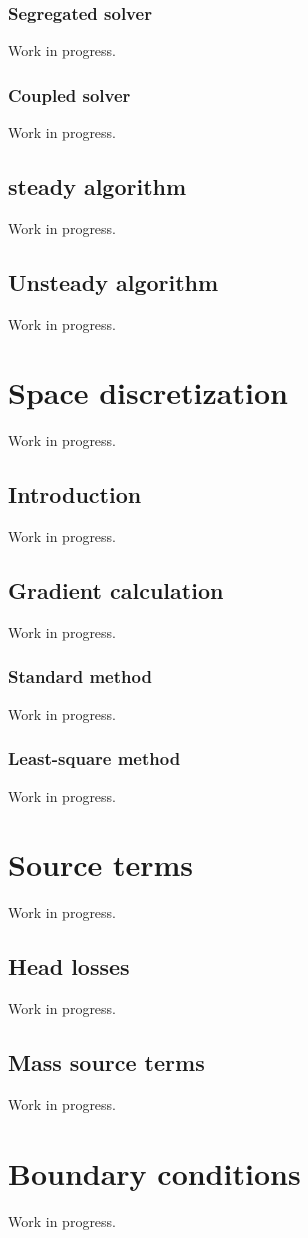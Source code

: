 \documentclass[a4paper,10pt,twoside]{csdoc}
\newcounter{prog}[part]
\begin{document}
\subsection{Segregated solver}
Work in progress.
\subsection{Coupled solver}
Work in progress.
\section{steady algorithm}
Work in progress.
\section{Unsteady algorithm}
Work in progress.

\chapter{Space discretization}
Work in progress.
\section{Introduction}
Work in progress.
\section{Gradient calculation}
Work in progress.
\subsection{Standard method}
Work in progress.
\subsection{Least-square method}
Work in progress.

\chapter{Source terms}
Work in progress.
\section{Head losses}
Work in progress.
\section{Mass source terms}
Work in progress.

\chapter{Boundary conditions}
Work in progress.
\end{document}
